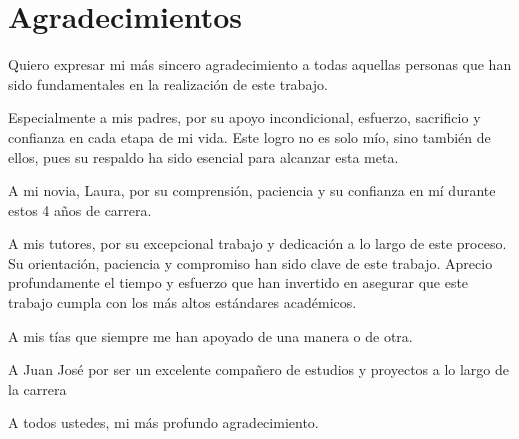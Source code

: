 \documentclass[12pt]{report}
\begin{document}
\chapter*{Agradecimientos}
Quiero expresar mi más sincero agradecimiento a todas aquellas personas que han sido fundamentales en la realización de este trabajo.  

Especialmente a mis padres, por su apoyo incondicional, esfuerzo, sacrificio y confianza en cada etapa de mi vida. Este logro no es solo mío, sino también de ellos, pues su respaldo ha sido esencial para alcanzar esta meta.

A mi novia, Laura, por su comprensión, paciencia y su confianza en mí durante estos 4 años de carrera.  

A mis tutores, por su excepcional trabajo y dedicación a lo largo de este proceso. Su orientación, paciencia y compromiso han sido clave de este trabajo. Aprecio profundamente el tiempo y esfuerzo que han invertido en asegurar que este trabajo cumpla con los más altos estándares académicos.  

A mis tías que siempre me han apoyado de una manera o de otra.

A Juan José por ser un excelente compañero de estudios y proyectos a lo largo de la carrera  

A todos ustedes, mi más profundo agradecimiento.  
%
%
%
%
%
\end{document}
